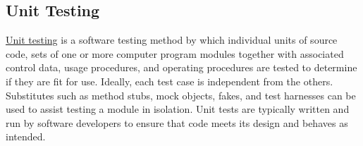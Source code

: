 \subsection{Unit Testing}

\href{http://en.wikipedia.org/wiki/Unit\_testing}{Unit testing} is a software testing method by which individual units of source code, sets of one or more computer program modules together with associated control data, usage procedures, and operating procedures are tested to determine if they are fit for use. Ideally, each test case is independent from the others. Substitutes such as method stubs, mock objects, fakes, and test harnesses can be used to assist testing a module in isolation. Unit tests are typically written and run by software developers to ensure that code meets its design and behaves as intended.